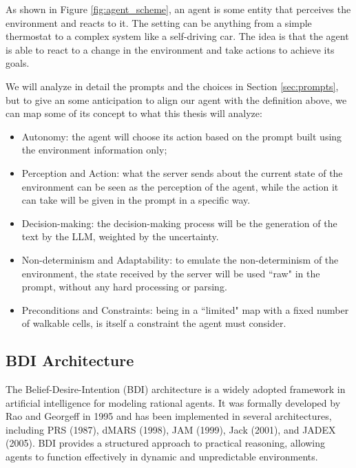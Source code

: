 As shown in Figure \ref{fig:agent_scheme}, an agent is some entity that perceives
the environment and reacts to it. The setting can be anything from a simple
thermostat to a complex system like a self-driving car. The idea is that the agent
is able to react to a change in the environment and take actions to achieve its goals.

We will analyze in detail the prompts and the choices in Section \ref{sec:prompts},
but to give an some anticipation to align our agent with the definition above, we
can map some of its concept to what this thesis will analyze:
\begin{itemize}
  \item Autonomy: the agent will choose its action based on the prompt built
    using the environment information only;

  \item Perception and Action: what the server sends about the current state of
    the environment can be seen as the perception of the agent, while the action
    it can take will be given in the prompt in a specific way.

  \item Decision-making: the decision-making process will be the generation of
    the text by the LLM, weighted by the uncertainty.

  \item Non-determinism and Adaptability: to emulate the non-determinism of the
    environment, the state received by the server will be used ``raw" in the
    prompt, without any hard processing or parsing.

  \item Preconditions and Constraints: being in a ``limited" map with a fixed number
    of walkable cells, is itself a constraint the agent must consider.
\end{itemize}

\subsection{BDI Architecture}
\label{sub:bdi_architecture}

The Belief-Desire-Intention (BDI) architecture is a widely adopted framework in
artificial intelligence for modeling rational agents. It was formally developed by
Rao and Georgeff in 1995 \cite{bdi-icmas95} and has been implemented in several architectures,
including PRS (1987), dMARS (1998), JAM (1999), Jack (2001), and JADEX (2005). BDI
provides a structured approach to practical reasoning, allowing agents to
function effectively in dynamic and unpredictable environments.

